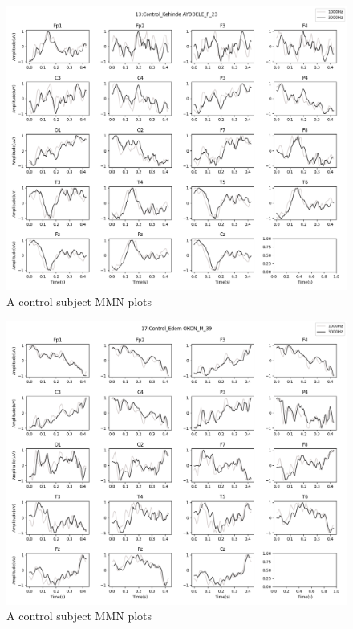 \documentclass[10pt]{article}
\begin{document}
\begin{figure}[H]
  \includegraphics[width=16cm]{../../../data_analysis_results/MMN/time_series/Control/13.png}
  \caption{A control subject MMN plots}
\end{figure}
\begin{figure}[H]
  \includegraphics[width=16cm]{../../../data_analysis_results/MMN/time_series/Control/17.png}
  \caption{A control subject MMN plots}
\end{figure}
\end{document}
